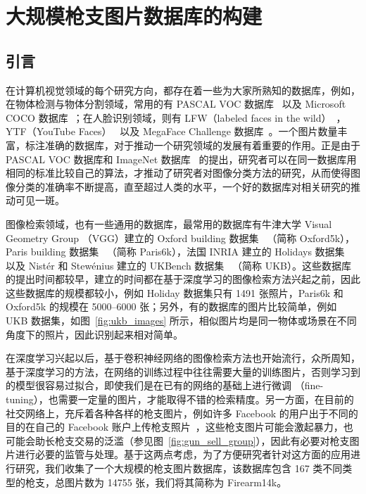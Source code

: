 
\chapter{大规模枪支图片数据库的构建}\label{chapter:firearm_dataset}
\section{引言}
在计算机视觉领域的每个研究方向，都存在着一些为大家所熟知的数据库，例如，在物体检测与物体分割领域，常用的有 PASCAL VOC 数据库~\cite{Everingham2014ThePV} 以及 Microsoft COCO 数据库~\cite{Lin2014MicrosoftCC}；在人脸识别领域，则有 LFW（labeled faces in the wild）~\cite{LFWTech}，YTF（YouTube Faces）~\cite{Wolf2011FaceRI} 以及 MegaFace Challenge 数据库~\cite{kemelmacher2016megaface}。一个图片数量丰富，标注准确的数据库，对于推动一个研究领域的发展有着重要的作用。正是由于 PASCAL VOC 数据库和 ImageNet 数据库~\cite{Russakovsky2015ImageNetLS} 的提出，研究者可以在同一数据库用相同的标准比较自己的算法，才推动了研究者对图像分类方法的研究，从而使得图像分类的准确率不断提高，直至超过人类的水平，一个好的数据库对相关研究的推动可见一斑。

图像检索领域，也有一些通用的数据库，最常用的数据库有牛津大学 Visual Geometry Group （VGG）建立的 Oxford building 数据集~\cite{Philbin2007ObjectRW} （简称 Oxford5k），Paris building 数据集~\cite{Philbin2008LostIQ} （简称 Paris6k），法国 INRIA 建立的 Holidays 数据集~\cite{Jgou2008HammingEA} 以及 Nist{\'e}r 和 Stew{\'e}nius 建立的 UKBench 数据集~\cite{Nistr2006ScalableRW} （简称 UKB）。这些数据库的提出时间都较早，建立的时间都在基于深度学习的图像检索方法兴起之前，因此这些数据库的规模都较小，例如 Holiday 数据集只有 1491 张照片，Paris6k 和 Oxford5k 的规模在 5000--6000 张；另外，有的数据库的图片比较简单，例如 UKB 数据集，如图~\ref{fig:ukb_images} 所示，相似图片均是同一物体或场景在不同角度下的照片，因此识别起来相对简单。

在深度学习兴起以后，基于卷积神经网络的图像检索方法也开始流行，众所周知，基于深度学习的方法，在网络的训练过程中往往需要大量的训练图片，否则学习到的模型很容易过拟合，即使我们是在已有的网络的基础上进行微调 （fine-tuning），也需要一定量的图片，才能取得不错的检索精度。另一方面，在目前的社交网络上，充斥着各种各样的枪支图片，例如许多 Facebook 的用户出于不同的目的在自己的 Facebook 账户上传枪支照片~\cite{Drange2016,MELE2016FacebookBG}，这些枪支图片可能会激起暴力，也可能会助长枪支交易的泛滥（参见图~\ref{fig:gun_sell_group}），因此有必要对枪支图片进行必要的监管与处理。基于这两点考虑，为了方便研究者针对这方面的应用进行研究，我们收集了一个大规模的枪支图片数据库，该数据库包含 167 类不同类型的枪支，总图片数为 14755 张，我们将其简称为 Firearm14k。


